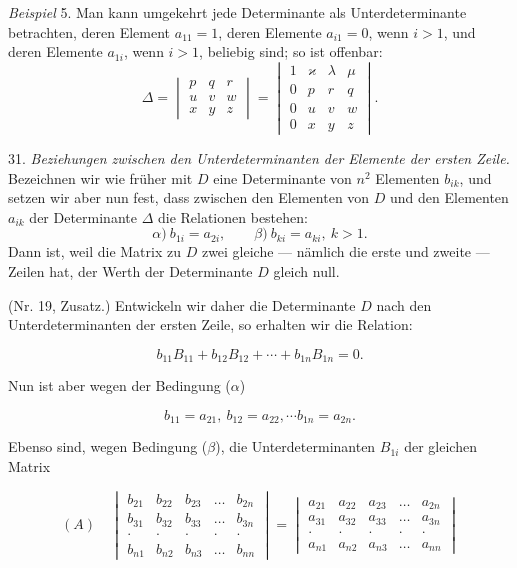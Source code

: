\documentclass[11pt]{article}
\providecommand{\weberpage}[1]{}
\providecommand{\weq}[2]{\begin{equation}\tag{#1}#2\end{equation}}
\let\Delta\varDelta
\begin{document}
\textit{Beispiel} 5. Man kann umgekehrt jede Determinante als
Unterdeterminante betrachten, deren Element $a_{11}=1$, deren Elemente
$a_{i1}=0$, wenn $i>1$, und deren Elemente $a_{1i}$, wenn $i>1$, beliebig
sind; so ist offenbar:
\[
\Delta=\begin{vmatrix} p & q & r \\ u & v & w \\ x & y & z \end{vmatrix}
=\begin{vmatrix}
1 & \varkappa & \lambda & \mu \\ %
0 & p & r & q \\ %
0 & u & v & w \\
0 & x & y & z
\end{vmatrix}.
\]

31. \textit{Beziehungen zwischen den Unterdeterminanten der Elemente der
ersten Zeile.} Bezeichnen wir wie früher mit $D$ eine Determinante von
$n^2$ Elementen $b_{ik}$, und setzen wir aber nun fest, dass zwischen den
Elementen von $D$ und den Elementen $a_{ik}$ der Determinante $\Delta$ die
Relationen bestehen:
\[
\alpha)\ b_{1i}=a_{2i}, \qquad \beta)\ b_{ki}=a_{ki},\ k>1.
\]
Dann ist, weil die Matrix zu $D$ zwei gleiche — nämlich die erste und
zweite — Zeilen hat, der Werth der Determinante $D$ gleich null.


\weberpage{37}
(Nr. 19, Zusatz.) Entwickeln wir daher die Determinante $D$ nach den
Unterdeterminanten der ersten Zeile, so erhalten wir die Relation:

\weq{1}{b_{11}B_{11}+b_{12}B_{12}+\cdots+b_{1n}B_{1n}=0.}

Nun ist aber wegen der Bedingung ($\alpha$)

\[
b_{11}=a_{21},\ b_{12}=a_{22},\cdots b_{1n}=a_{2n}.
\]

Ebenso sind, wegen Bedingung ($\beta$), die Unterdeterminanten $B_{1i}$ der
gleichen Matrix

\[
(A)\quad
\begin{vmatrix}
b_{21} & b_{22} & b_{23} & \ldots & b_{2n} \\
b_{31} & b_{32} & b_{33} & \ldots & b_{3n} \\
\cdot & \cdot & \cdot & \cdot & \cdot \\
b_{n1} & b_{n2} & b_{n3} & \ldots & b_{nn}
\end{vmatrix}
=
\begin{vmatrix}
a_{21} & a_{22} & a_{23} & \ldots & a_{2n} \\
a_{31} & a_{32} & a_{33} & \ldots & a_{3n} \\
\cdot & \cdot & \cdot & \cdot & \cdot \\
a_{n1} & a_{n2} & a_{n3} & \ldots & a_{nn}
\end{vmatrix}
\]
\end{document}

